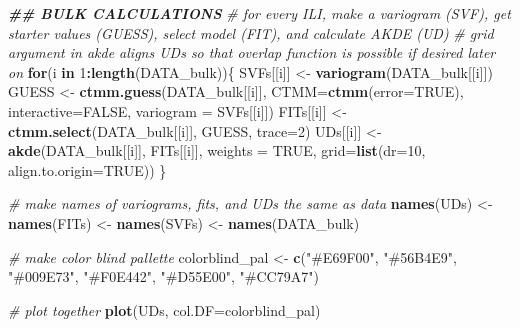 \documentclass[
]{article}
\newenvironment{Shaded}{\begin{snugshade}}{\end{snugshade}}
\newcommand{\AttributeTok}[1]{\textcolor[rgb]{0.13,0.29,0.53}{#1}}
\newcommand{\CommentTok}[1]{\textcolor[rgb]{0.56,0.35,0.01}{\textit{#1}}}
\newcommand{\ConstantTok}[1]{\textcolor[rgb]{0.56,0.35,0.01}{#1}}
\newcommand{\ControlFlowTok}[1]{\textcolor[rgb]{0.13,0.29,0.53}{\textbf{#1}}}
\newcommand{\DecValTok}[1]{\textcolor[rgb]{0.00,0.00,0.81}{#1}}
\newcommand{\DocumentationTok}[1]{\textcolor[rgb]{0.56,0.35,0.01}{\textbf{\textit{#1}}}}
\newcommand{\FunctionTok}[1]{\textcolor[rgb]{0.13,0.29,0.53}{\textbf{#1}}}
\newcommand{\NormalTok}[1]{#1}
\newcommand{\OtherTok}[1]{\textcolor[rgb]{0.56,0.35,0.01}{#1}}
\newcommand{\SpecialCharTok}[1]{\textcolor[rgb]{0.81,0.36,0.00}{\textbf{#1}}}
\newcommand{\StringTok}[1]{\textcolor[rgb]{0.31,0.60,0.02}{#1}}
\begin{document}
\begin{Shaded}
\begin{Highlighting}[]
\DocumentationTok{\#\# BULK CALCULATIONS}
\CommentTok{\# for every ILI, make a variogram (SVF), get starter values (GUESS), select model (FIT), and calculate AKDE (UD)}
\CommentTok{\# grid argument in akde aligns UDs so that overlap function is possible if desired later on}
\ControlFlowTok{for}\NormalTok{(i }\ControlFlowTok{in} \DecValTok{1}\SpecialCharTok{:}\FunctionTok{length}\NormalTok{(DATA\_bulk))\{}
\NormalTok{  SVFs[[i]] }\OtherTok{\textless{}{-}} \FunctionTok{variogram}\NormalTok{(DATA\_bulk[[i]])}
\NormalTok{  GUESS }\OtherTok{\textless{}{-}} \FunctionTok{ctmm.guess}\NormalTok{(DATA\_bulk[[i]],}
                      \AttributeTok{CTMM=}\FunctionTok{ctmm}\NormalTok{(}\AttributeTok{error=}\ConstantTok{TRUE}\NormalTok{),}
                      \AttributeTok{interactive=}\ConstantTok{FALSE}\NormalTok{, }
                      \AttributeTok{variogram =}\NormalTok{ SVFs[[i]])}
\NormalTok{  FITs[[i]] }\OtherTok{\textless{}{-}} \FunctionTok{ctmm.select}\NormalTok{(DATA\_bulk[[i]],}
\NormalTok{                           GUESS,}
                           \AttributeTok{trace=}\DecValTok{2}\NormalTok{)}
\NormalTok{  UDs[[i]] }\OtherTok{\textless{}{-}} \FunctionTok{akde}\NormalTok{(DATA\_bulk[[i]],}
\NormalTok{                   FITs[[i]], }
                   \AttributeTok{weights =} \ConstantTok{TRUE}\NormalTok{, }
                   \AttributeTok{grid=}\FunctionTok{list}\NormalTok{(}\AttributeTok{dr=}\DecValTok{10}\NormalTok{, }\AttributeTok{align.to.origin=}\ConstantTok{TRUE}\NormalTok{)) }
\NormalTok{\}}

\CommentTok{\# make names of variograms, fits, and UDs the same as data}
\FunctionTok{names}\NormalTok{(UDs) }\OtherTok{\textless{}{-}} \FunctionTok{names}\NormalTok{(FITs) }\OtherTok{\textless{}{-}} \FunctionTok{names}\NormalTok{(SVFs) }\OtherTok{\textless{}{-}} \FunctionTok{names}\NormalTok{(DATA\_bulk)}
\end{Highlighting}
\end{Shaded}

\begin{Shaded}
\begin{Highlighting}[]
\CommentTok{\# make color blind pallette}
\NormalTok{colorblind\_pal }\OtherTok{\textless{}{-}} \FunctionTok{c}\NormalTok{(}\StringTok{"\#E69F00"}\NormalTok{, }\StringTok{"\#56B4E9"}\NormalTok{, }\StringTok{"\#009E73"}\NormalTok{, }\StringTok{"\#F0E442"}\NormalTok{, }\StringTok{"\#D55E00"}\NormalTok{, }\StringTok{"\#CC79A7"}\NormalTok{)}

\CommentTok{\# plot together}
\FunctionTok{plot}\NormalTok{(UDs, }\AttributeTok{col.DF=}\NormalTok{colorblind\_pal)}
\end{Highlighting}
\end{Shaded}
\end{document}
